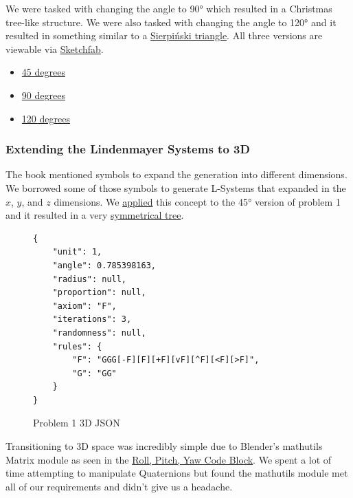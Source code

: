 We were tasked with changing the angle to 90° which resulted in a
Christmas tree-like structure. We were also tasked with changing the angle to
120° and it resulted in something similar to a
\href{https://en.wikipedia.org/wiki/Sierpi%C5%84ski_triangle}{Sierpiński triangle}.
All three versions are viewable via
\href{https://sketchfab.com/macattackftw/collections/problem-1}{Sketchfab}.

\begin{itemize}
    \item \href{https://sketchfab.com/3d-models/prob1-45-a97f7475b6964b9c930796ba985ac255}{45 degrees}
    \item \href{https://sketchfab.com/3d-models/8c7a25615cee4fb4a51ab3deeae154a0}{90 degrees}
    \item \href{https://sketchfab.com/3d-models/b36c6e912ee548b9a549bd8e0bb273c8}{120 degrees}
\end{itemize}


\subsubsection{Extending the Lindenmayer Systems to 3D}
The book mentioned symbols to expand the generation into different dimensions.
We borrowed some of those symbols to generate L-Systems that expanded in the
$x$, $y$, and $z$ dimensions. We \hyperref[code:prob1_3D_json]{applied} this
concept to the 45° version of problem 1 and it resulted in a very
\href{https://sketchfab.com/3d-models/prob1-3d-236e501897a945d0a3eb5e4cba37fa3a}{symmetrical tree}.

\begin{figure}
    \begin{verbatim}
{
    "unit": 1,
    "angle": 0.785398163,
    "radius": null,
    "proportion": null,
    "axiom": "F",
    "iterations": 3,
    "randomness": null,
    "rules": {
        "F": "GGG[-F][F][+F][vF][^F][<F][>F]",
        "G": "GG"
    }
}
\end{verbatim}
    \caption*{Problem 1 3D JSON}
    \label{code:prob1_3D_json}
\end{figure}

Transitioning to 3D space was incredibly simple due to Blender's mathutils
Matrix module as seen in the
\hyperref[code:roll_pitch_yaw]{Roll, Pitch, Yaw Code Block}. We spent a lot of
time attempting to manipulate Quaternions but found the mathutils module met
all of our requirements and didn't give us a headache.

